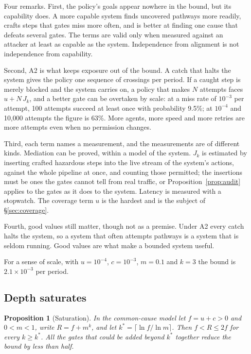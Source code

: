 \documentclass[10pt,twocolumn,letterpaper]{article}
\newtheorem{proposition}{Proposition}
\theoremstyle{definition}
\begin{document}
Four remarks. First, the policy's goals appear nowhere in the bound, but its capability does. A more capable system finds uncovered pathways more readily, crafts steps that gates miss more often, and is better at finding one cause that defeats several gates. The terms are valid only when measured against an attacker at least as capable as the system. Independence from alignment is not independence from capability.

Second, A2 is what keeps exposure out of the bound. A catch that halts the system gives the policy one sequence of crossings per period. If a caught step is merely blocked and the system carries on, a policy that makes $N$ attempts faces $u+N\,J_{k}$, and a better gate can be overtaken by scale: at a miss rate of $10^{-3}$ per attempt, 100 attempts succeed at least once with probability 9.5\%; at $10^{-4}$ and 10,000 attempts the figure is 63\%. More agents, more speed and more retries are more attempts even when no permission changes.

Third, each term names a measurement, and the measurements are of different kinds. Mediation can be proved, within a model of the system. $J_{k}$ is estimated by inserting crafted hazardous steps into the live stream of the system's actions, against the whole pipeline at once, and counting those permitted; the insertions must be ones the gates cannot tell from real traffic, or Proposition~\ref{prop:audit} applies to the gates as it does to the system. Latency is measured with a stopwatch. The coverage term $u$ is the hardest and is the subject of \S\ref{sec:coverage}.

Fourth, good values still matter, though not as a premise. Under A2 every catch halts the system, so a system that often attempts pathways is a system that is seldom running. Good values are what make a bounded system useful.

For a sense of scale, with $u=10^{-4}$, $c=10^{-3}$, $m=0.1$ and $k=3$ the bound is $2.1\times10^{-3}$ per period.

\subsection{Depth saturates}

\begin{proposition}[Saturation]
\label{prop:sat}
In the common-cause model let $f=u+c>0$ and $0<m<1$, write $R=f+m^{k}$, and let $k^{*}=\lceil \ln f/\ln m\rceil$. Then $f<R\le 2f$ for every $k\ge k^{*}$. All the gates that could be added beyond $k^{*}$ together reduce the bound by less than half.
\end{proposition}
\end{document}
